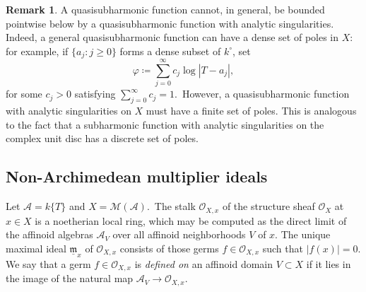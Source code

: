 \documentclass[10pt,reqno]{amsart}
\theoremstyle{plain}
\theoremstyle{definition}
\newtheorem{remark}[theorem]{Remark}
\newcommand{\frakm}{\mathfrak{m}}
\renewcommand{\H}{\mathcal{H}}
\numberwithin{equation}{section}
\renewcommand{\O}{\mathcal{O}}
\newcommand{\M}{\mathcal{M}}
\DeclareMathOperator{\rig}{rig}
\begin{document}
\begin{comment}
It remains to show that the subsequence $\left( \varphi_{2^k}\right)_{k=1}^{\infty}$ is pointwise decreasing. Fix positive integers $m,n >0$. For any $f \in \H_{(m+n)\varphi}\backslash \{ 0\}$ and any $\epsilon > 0$, observe that $\| f \|_{(1+\epsilon)(m+n)\varphi} e^{m\varphi_m + n\varphi_n} \geq \| f \|_{-\epsilon(m+n)\varphi}$ because $\varphi \leq \varphi_m$ and $\varphi \leq \varphi_n$. The supremum defining $\| f \|_{-\epsilon(m+n)\varphi}$ is maximized at the Gauss point as soon as 
$$
\epsilon < \frac{1}{m+n} \sup_{x \in X^{\rig}} \Delta \varphi \{ x \},
$$ 
hence $\| f \|_{(1+\epsilon)(m+n)\varphi} e^{m\varphi_m + n\varphi_n} \geq |f(x_G)|e^{-\epsilon(m+n)\varphi(x_G)}.$
Taking the limit as $\epsilon \to 0^+$ gives the inequality $\| f \|^+_{(m+n)\varphi}e^{m\varphi_m + n\varphi_n} \geq |f(x_G)|$. After rearranging and taking the supremum over all $f \in \H_{(m+n)\varphi} \backslash \{ 0\}$, we obtain
$$
m\varphi_m + n\varphi_n \geq \sup_{f \in \H_{m\varphi}\backslash \{0\}} \log \frac{|f|}{\| f \|^+_{(m+n)\varphi}}.
$$
As $m\varphi_m + n\varphi_n$ is upper-semicontinuous, it follows that $m\varphi_m + n\varphi_n \geq (m+n)\varphi_{m+n}$. Taking $m = n = 2^{k-1}$ yields $\varphi_{2^k} \leq \varphi_{2^{k-1}}$ for all $k \geq 1$. 
\end{comment}

\begin{remark}
A quasisubharmonic function cannot, in general, be bounded pointwise below by a quasisubharmonic function with analytic singularities. Indeed, a general quasisubharmonic function can have a dense set of poles in $X$: for example, if $\{ a_j \colon j \geq 0 \}$ forms a dense subset of $k^{\circ}$, set
$$\varphi \coloneqq \sum_{j=0}^{\infty} c_j \log |T-a_j|,$$
for some $c_j > 0$ satisfying $\sum_{j=0}^{\infty} c_j = 1$.\ However, a quasisubharmonic function with analytic singularities on $X$ must have a finite set of poles. This is analogous to the fact that a subharmonic function with analytic singularities on the complex unit disc has a discrete set of poles.
\end{remark}

\subsection{Non-Archimedean multiplier ideals}\label{section:multiplier}
Let $\mathcal{A} = k\{ T \}$ and $X=\M(\mathcal{A})$.\ The stalk $\O_{X,x}$ of the structure sheaf $\O_X$ at $x \in X$ is a noetherian local ring, which may be computed as the direct limit of the affinoid algebras $\mathcal{A}_V$ over all affinoid neighborhoods $V$ of $x$. The unique maximal ideal $\underline{\frakm}_x$ of $\O_{X,x}$ consists of those germs $f \in \O_{X,x}$ such that $|f(x)| = 0$. We say that a germ $f \in \O_{X,x}$ is \emph{defined on} an affinoid domain $V \subset X$ if it lies in the image of the natural map $\mathcal{A}_V \to \O_{X,x}$. 
\end{document}
